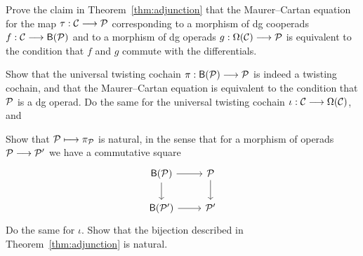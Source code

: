 \begin{question}
Prove the claim in Theorem~\ref{thm:adjunction} that the Maurer--Cartan
equation for the map $\tau : \mathcal{C}\longrightarrow {\mathcal{P}}$ corresponding
to a morphism of dg cooperads $f : \mathcal{C}\longrightarrow \mathsf{B}({\mathcal{P}})$
and to a morphism of dg operads $g  :\Omega(\mathcal{C}) \longrightarrow {\mathcal{P}}$
is equivalent to the condition that $f$ and $g$ commute with the
differentials.
\end{question}


\begin{question}\label{ex:universaltw}
Show that the universal twisting cochain
$\pi:\mathsf{B}({\mathcal{P}})\longrightarrow {\mathcal{P}}$ is indeed
a twisting cochain, and that the Maurer--Cartan
equation is equivalent to the condition that 
${\mathcal{P}}$ is a dg operad. Do the same for the 
 universal twisting cochain $\iota : \mathcal{C} 
\longrightarrow \Omega(\mathcal{C})$, and 
\end{question}


\begin{question}
Show that ${\mathcal{P}} \longmapsto \pi_{\mathcal{P}}$ is natural, in
the sense that for a morphism of operads ${\mathcal{P}}\longrightarrow 
{\mathcal{P}}'$ we have a commutative square
\[
\begin{tikzcd}[ampersand replacement=\&]
\B{\PP} \arrow[r] \arrow[d] \&  \PP \arrow[d] \\
\B{\PP'} \arrow[r] \& \PP'
\end{tikzcd}
\]
Do the same for $\iota$. Show that the bijection described in Theorem~\ref{thm:adjunction} 
is natural.  
\end{question}